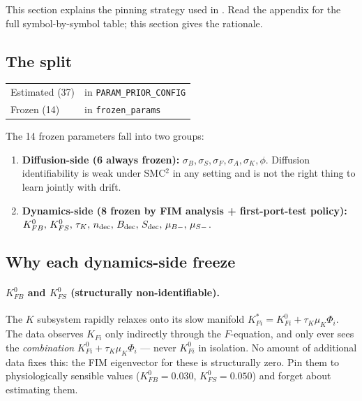 \documentclass[11pt,a4paper]{article}
\theoremstyle{definition}
\begin{document}
This section explains the pinning strategy used in
. Read the appendix for the full
symbol-by-symbol table; this section gives the rationale.

\subsection{The split}

\begin{center}
\begin{tabular}{ll}
\toprule
Estimated (37) & in \texttt{PARAM\_PRIOR\_CONFIG} \\
Frozen (14)    & in \texttt{frozen\_params} \\
\bottomrule
\end{tabular}
\end{center}

The 14 frozen parameters fall into two groups:

\begin{enumerate}
  \item \textbf{Diffusion-side (6 always frozen):}
        $\sigma_B, \sigma_S, \sigma_F, \sigma_A, \sigma_K, \phi$.
        Diffusion identifiability is weak under SMC$^2$ in any setting
        and is not the right thing to learn jointly with drift.
  \item \textbf{Dynamics-side (8 frozen by FIM analysis + first-port-test policy):}
        $K_{FB}^0,\, K_{FS}^0,\, \tau_K,\, n_{\rm dec},\, B_{\rm dec},\,
        S_{\rm dec},\, \mu_{B-},\, \mu_{S-}$.
\end{enumerate}

\subsection{Why each dynamics-side freeze}

\paragraph{$K_{FB}^0$ and $K_{FS}^0$ (structurally non-identifiable).}
The $K$ subsystem rapidly relaxes onto its slow manifold $K_{Fi}^* =
K_{Fi}^0 + \tau_K \mu_K \Phi_i$. The data observes $K_{Fi}$ only
indirectly through the $F$-equation, and only ever sees the
\emph{combination} $K_{Fi}^0 + \tau_K \mu_K \Phi_i$ --- never $K_{Fi}^0$
in isolation. No amount of additional data fixes this: the FIM
eigenvector for these is structurally zero. Pin them to physiologically
sensible values ($K_{FB}^0 = 0.030$, $K_{FS}^0 = 0.050$) and forget
about estimating them.
\end{document}
